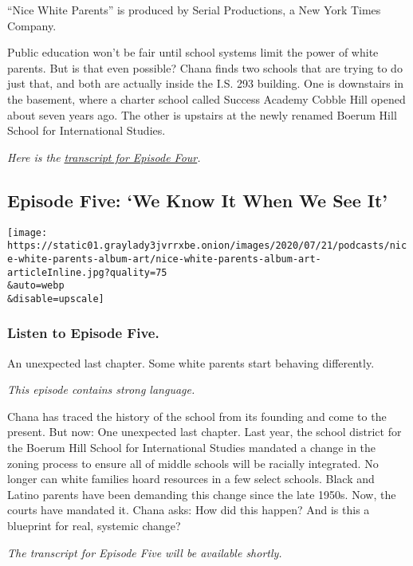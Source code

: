 ``Nice White Parents'' is produced by Serial Productions, a New York
Times Company.

Public education won't be fair until school systems limit the power of
white parents. But is that even possible? Chana finds two schools that
are trying to do just that, and both are actually inside the I.S. 293
building. One is downstairs in the basement, where a charter school
called Success Academy Cobble Hill opened about seven years ago. The
other is upstairs at the newly renamed Boerum Hill School for
International Studies.

\emph{Here is the}
\href{https://www.nytimes3xbfgragh.onion/2020/08/13/podcasts/nice-white-parents-school.html?showTranscript=}{\emph{transcript
for Episode Four}}\emph{.}

\hypertarget{episode-five-we-know-it-when-we-see-it}{%
\subsection{Episode Five: `We Know It When We See
It'}\label{episode-five-we-know-it-when-we-see-it}}

\texttt{[image: https://static01.graylady3jvrrxbe.onion/images/2020/07/21/podcasts/nice-white-parents-album-art/nice-white-parents-album-art-articleInline.jpg?quality=75\\\&auto=webp\\\&disable=upscale]}

\hypertarget{listen-to-episode-five}{%
\subsubsection{Listen to Episode Five.}\label{listen-to-episode-five}}

An unexpected last chapter. Some white parents start behaving
differently.

\emph{This episode contains strong language.}

Chana has traced the history of the school from its founding and come to
the present. But now: One unexpected last chapter. Last year, the school
district for the Boerum Hill School for International Studies mandated a
change in the zoning process to ensure all of middle schools will be
racially integrated. No longer can white families hoard resources in a
few select schools. Black and Latino parents have been demanding this
change since the late 1950s. Now, the courts have mandated it. Chana
asks: How did this happen? And is this a blueprint for real, systemic
change?

\emph{The transcript for Episode Five will be available shortly.}

